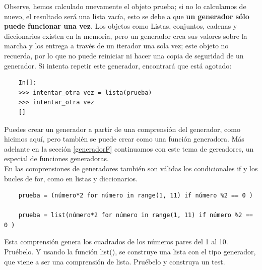 Observe, hemos calculado nuevamente el objeto prueba; si no lo calculamos de nuevo, el resultado  será una lista vacía, 
esto se debe a que {\bf un generador sólo puede funcionar una vez}. Los objetos como Listas, conjuntos, cadenas y diccionarios existen en la memoria, pero un generador crea sus valores sobre la marcha y los entrega a través de un iterador una sola vez; 
este objeto  no recuerda, por lo que no puede reiniciar ni hacer una copia de seguridad de un generador.
Si intenta repetir este generador, encontrará que está agotado:

\begin{lstlisting}
	In[]:
	>>> intentar_otra vez = lista(prueba)
	>>> intentar_otra vez
	[]
\end{lstlisting}

Puedes crear un generador a partir de una comprensión del generador, como hicimos aquí, pero también se puede crear como una función generadora. Más adelante en la sección \ref{generadorF} continuamos con este tema de gereadores,  un  especial de funciones generadoras.\\

En las comprensiones de generadores también son válidas los condicionales  {\ttfamily if} y los bucles de  {\ttfamily for}, como en listas y diccionarios.

\begin{lstlisting}
	prueba = (número*2 for número in range(1, 11) if número %2 == 0 )
	
	prueba = list(número*2 for número in range(1, 11) if número %2 == 0 )
\end{lstlisting}

Esta comprensión  genera los cuadrados de los números pares del 1 al 10. Pruébelo. Y usando la función {\ttfamily list()}, 
se construye una lista con el tipo  generador, que viene a ser una comprensión de lista. Pruébelo y construya un test.  



